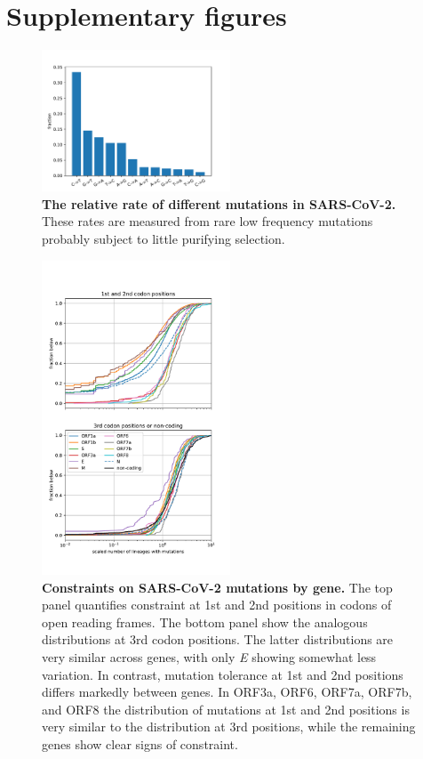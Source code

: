 \section*{Supplementary figures}

\setcounter{figure}{0}
\renewcommand{\figurename}{Figure S}
\setcounter{table}{0}
\renewcommand{\tablename}{Table S}


\begin{figure}[h]
    \includegraphics[width=0.5\textwidth]{figures/mutation_distribution.pdf}
    \caption{{\bf The relative rate of different mutations in SARS-CoV-2.}
    These rates are measured from rare low frequency mutations probably subject to little purifying selection.
    \label{fig:mutation_distribution}}
\end{figure}

\begin{figure}[h]
    \includegraphics[width=0.5\textwidth]{figures/fitness_cost_by_gene.pdf}
    \caption{{\bf Constraints on SARS-CoV-2 mutations by gene.}
    The top panel quantifies constraint at 1st and 2nd positions in codons of open reading frames.
    The bottom panel show the analogous distributions at 3rd codon positions.
    The latter distributions are very similar across genes, with only \emph{E} showing somewhat less variation.
    In contrast, mutation tolerance at 1st and 2nd positions differs markedly between genes.
    In ORF3a, ORF6, ORF7a, ORF7b, and ORF8 the distribution of mutations at 1st and 2nd positions is very similar to the distribution at 3rd positions, while the remaining genes show clear signs of constraint.
    \label{fig:fitness_costs_supp}}
 \end{figure}
